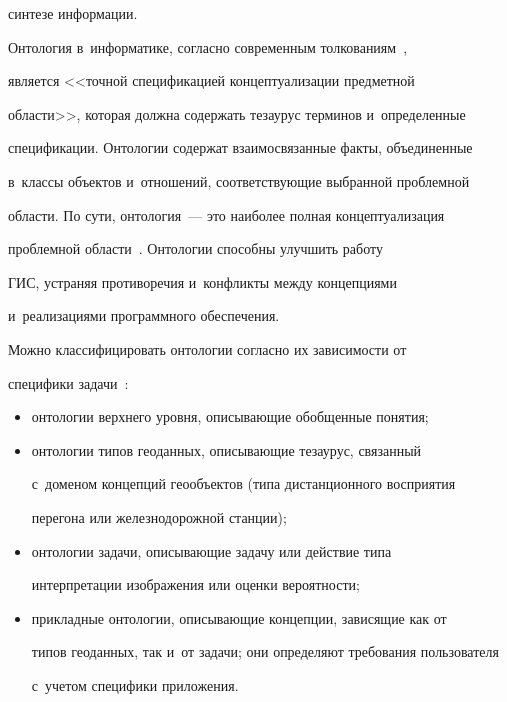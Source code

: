 синтезе информации.


  


  Онтология в~информатике, согласно современным толкованиям~\cite{5-nik}, 


является <<точной спецификацией концептуализации предметной 


области>>, которая должна содержать тезаурус терминов и~определенные 


спецификации. Онтологии содержат взаимосвязанные факты, объединенные 


в~классы объектов и~отношений, соответствующие выбранной проблемной 


области. По сути, онтология~--- это наиболее полная концептуализация 


проблемной области~\cite{5-nik}. Онтологии способны улучшить работу 


ГИС, устраняя противоречия и~конфликты между концепциями 


и~реализациями программного обеспечения. 


  


  Можно классифицировать онтологии согласно их зависимости от 


специфики задачи~\cite{6-nik}:


  \begin{itemize}


  \item онтологии верхнего уровня, опи\-сы\-ва\-ющие обобщенные понятия;


  \item онтологии типов геоданных, опи\-сы\-ва\-ющие тезаурус, связанный 


с~доменом концепций геообъектов (типа дистанционного восприятия 


перегона или железнодорожной станции);


  \item онтологии задачи, опи\-сы\-ва\-ющие задачу или действие типа 


интерпретации изображения или оценки вероятности;


  \item прикладные онтологии, опи\-сы\-ва\-ющие концепции, зависящие как от 


типов геоданных, так и~от задачи; они определяют требования пользователя 


с~учетом специфики приложения.


  \end{itemize}


